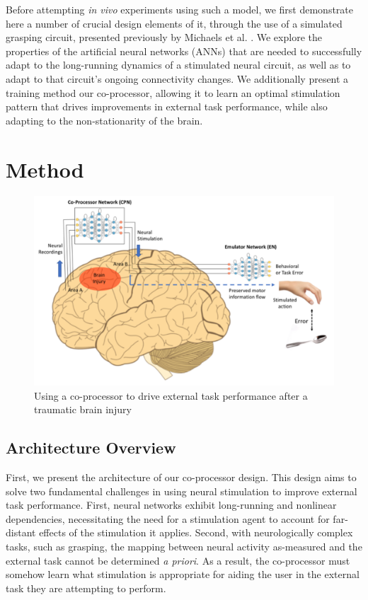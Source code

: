 \documentclass[12pt]{iopart}
\begin{document}
Before attempting \textit{in vivo} experiments using such a model, we first demonstrate
here a number of crucial design elements of it, through the use of a simulated
grasping circuit, presented previously by Michaels et al. \cite{michaels.mrnn}. We
explore the properties of the artificial neural networks (ANNs) that are needed to
successfully adapt to the long-running dynamics of a stimulated neural circuit,
as well as to adapt to that circuit's ongoing connectivity changes.
We additionally present a training method our co-processor, allowing it to learn
an optimal stimulation pattern that drives improvements in external task performance,
while also adapting to the non-stationarity of the brain.

\section{Method}

\begin{figure}
\includegraphics[width=\textwidth]{weill_arch.png}
\caption{Using a co-processor to drive external task performance after a traumatic brain injury}
\centering
\label{fig:weill}
\end{figure}

\subsection{Architecture Overview}
First, we present the architecture of our co-processor design. This design aims to solve two
fundamental challenges in using neural stimulation to improve external task performance.
First, neural networks exhibit long-running and nonlinear dependencies, necessitating
the need for a stimulation agent to account for far-distant effects of the stimulation it
applies. Second, with neurologically complex tasks, such as grasping, the mapping between
neural activity as-measured and the external task cannot be determined \textit{a priori}.
As a result, the co-processor must somehow learn what stimulation is appropriate for
aiding the user in the external task they are attempting to perform.
\end{document}
